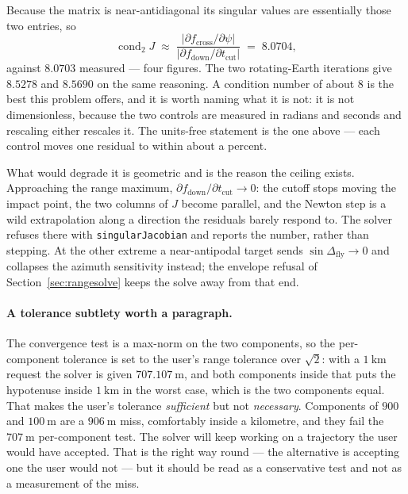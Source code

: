 \documentclass[11pt]{article}
\newcommand{\code}[1]{\texttt{#1}}
\begin{document}
Because the matrix is near-antidiagonal its singular values are essentially
those two entries, so
\begin{equation}
  \operatorname{cond}_2 J \;\approx\;
  \frac{|\partial f_{\text{cross}}/\partial\psi|}
       {|\partial f_{\text{down}}/\partial t_{\text{cut}}|}
  \;=\; 8.0704 ,
  \label{eq:condapprox}
\end{equation}
against $8.0703$ measured --- four figures. The two rotating-Earth iterations
give $8.5278$ and $8.5690$ on the same reasoning. A condition number of about
$8$ is the best this problem offers, and it is worth naming what it is not: it
is not dimensionless, because the two controls are measured in radians and
seconds and rescaling either rescales it. The units-free statement is the one
above --- each control moves one residual to within about a percent.

What would degrade it is geometric and is the reason the ceiling exists.
Approaching the range maximum, $\partial f_{\text{down}}/\partial
t_{\text{cut}}\to 0$: the cutoff stops moving the impact point, the two columns
of $J$ become parallel, and the Newton step is a wild extrapolation along a
direction the residuals barely respond to. The solver refuses there with
\code{singularJacobian} and reports the number, rather than stepping. At the
other extreme a near-antipodal target sends $\sin\Delta_{\text{fly}}\to 0$ and
collapses the azimuth sensitivity instead; the envelope refusal of
Section~\ref{sec:rangesolve} keeps the solve away from that end.

\paragraph{A tolerance subtlety worth a paragraph.} The convergence test is a
max-norm on the two components, so the per-component tolerance is set to the
user's range tolerance over $\sqrt2$: with a $1~\mathrm{km}$ request the solver
is given $707.107~\mathrm{m}$, and both components inside that puts the
hypotenuse inside $1~\mathrm{km}$ in the worst case, which is the two
components equal. That makes the user's tolerance \emph{sufficient} but not
\emph{necessary}. Components of $900$ and $100~\mathrm{m}$ are a
$906~\mathrm{m}$ miss, comfortably inside a kilometre, and they fail the
$707~\mathrm{m}$ per-component test. The solver will keep working on a
trajectory the user would have accepted. That is the right way round --- the
alternative is accepting one the user would not --- but it should be read as a
conservative test and not as a measurement of the miss.
\end{document}
